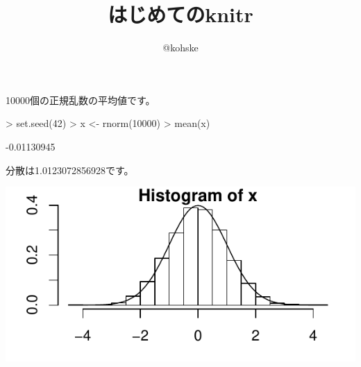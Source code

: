 \documentclass{ltjsarticle}
\title{はじめての\textbf{knitr}}
\author{@kohske}
\begin{document}
\maketitle

10000個の正規乱数の平均値です。

\begin{Schunk}
\begin{Sinput}
> set.seed(42)
> x <- rnorm(10000)
> mean(x)
\end{Sinput}
\begin{Soutput}
[1] -0.01130945
\end{Soutput}
\end{Schunk}

分散は1.0123072856928です。

\vspace{1em}
\includegraphics{minimal-sweave-minimal-sweave-plot}
\end{document}
